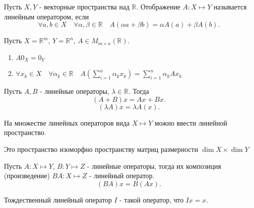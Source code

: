 \begin{definition} \thmslashn 

    Пусть $X, Y$ - векторные пространства над $\mathbb{R}$. Отображение $A : X \mapsto Y$ называется линейным оператором, если 
    \[ \forall{a, b\in X}\quad \forall{\alpha, \beta\in \mathbb{R}}\quad A(\alpha a + \beta b) = \alpha A(a) + \beta A(b) .\] 
\end{definition}
\begin{example} \thmslashn

    Пусть $X = \mathbb{R}^{m}$, $Y = \mathbb{R}^{n}$, $A\in M_{m \times n}(\mathbb{R})$.
\end{example}
\begin{properties} \thmslashn

    \begin{enumerate}
        \item $A 0_{X} = 0_{Y}$ 
        \item $\forall{x_{k}\in X}\quad \forall{\alpha_{k}\in \mathbb{R}}\quad  A\left( \sum\limits_{i=1}^{n} \alpha_{k}x_{k} \right) = \sum\limits_{i=1}^{n} \alpha_{k} Ax_{k}$
    \end{enumerate}
\end{properties}
\begin{definition} \thmslashn 

    Пусть $A, B$ - линейные операторы, $\lambda\in \mathbb{R}$. Тогда
    \[ (A+B)x = Ax + Bx .\]
    \[ (\lambda A)x = \lambda A(x) .\] 
\end{definition}
\begin{consequence} \thmslashn

    На множестве линейных операторов вида $X \mapsto Y$ можно ввести линейной пространство.
\end{consequence}
\begin{remark_author} \thmslashn

    Это пространство изоморфно пространству матриц размерности $\dim X \times \dim Y$
\end{remark_author}
\begin{definition} \thmslashn 

    Пусть $A : X \mapsto Y$, $B : Y \mapsto Z$ - линейные операторы, тогда их композиция (произведение) $BA : X \mapsto Z$ - линейный оператор.
    \[ (BA)x = B(Ax) .\] 
\end{definition}
\begin{definition} \thmslashn 

Тождественный линейный оператор $I$ - такой оператор, что $Ix = x$.
\end{definition}

